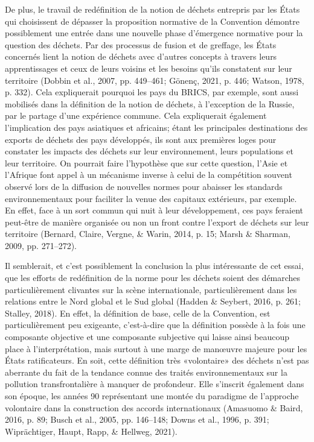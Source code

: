 \documentclass[12pt]{ulaval}
\begin{document}
De plus, le travail de redéfinition de la notion de déchets entrepris par les États qui choisissent de dépasser la proposition normative de la Convention démontre possiblement une entrée dans une nouvelle phase d'émergence normative pour la question des déchets. Par des processus de fusion et de greffage, les États concernés lient la notion de déchets avec d'autres concepts à travers leurs apprentissages et ceux de leurs voisins et les besoins qu'ils constatent sur leur territoire (Dobbin et al., 2007, pp. 449--461; Gönenç, 2021, p. 446; Watson, 1978, p. 332). Cela expliquerait pourquoi les pays du BRICS, par exemple, sont aussi mobilisés dans la définition de la notion de déchets, à l'exception de la Russie, par le partage d'une expérience commune. Cela expliquerait également l'implication des pays asiatiques et africains; étant les principales destinations des exports de déchets des pays développés, ils sont aux premières loges pour constater les impacts des déchets sur leur environnement, leurs populations et leur territoire. On pourrait faire l'hypothèse que sur cette question, l'Asie et l'Afrique font appel à un mécanisme inverse à celui de la compétition souvent observé lors de la diffusion de nouvelles normes pour abaisser les standards environnementaux pour faciliter la venue des capitaux extérieurs, par exemple. En effet, face à un sort commun qui nuit à leur développement, ces pays feraient peut-être de manière organisée ou non un front contre l'export de déchets sur leur territoire (Bernard, Claire, Vergne, \& Warin, 2014, p. 15; Marsh \& Sharman, 2009, pp. 271--272).

Il semblerait, et c'est possiblement la conclusion la plus intéressante de cet essai, que les efforts de redéfinition de la norme pour les déchets soient des démarches particulièrement clivantes sur la scène internationale, particulièrement dans les relations entre le Nord global et le Sud global (Hadden \& Seybert, 2016, p. 261; Stalley, 2018). En effet, la définition de base, celle de la Convention, est particulièrement peu exigeante, c'est-à-dire que la définition possède à la fois une composante objective et une composante subjective qui laisse ainsi beaucoup place à l'interprétation, mais surtout à une marge de manœuvre majeure pour les États ratificateurs. En soit, cette définition très «volontaire» des déchets n'est pas aberrante du fait de la tendance connue des traités environnementaux sur la pollution transfrontalière à manquer de profondeur. Elle s'inscrit également dans son époque, les années 90 représentant une montée du paradigme de l'approche volontaire dans la construction des accords internationaux (Amasuomo \& Baird, 2016, p. 89; Busch et al., 2005, pp. 146--148; Downs et al., 1996, p. 391; Wiprächtiger, Haupt, Rapp, \& Hellweg, 2021).
\end{document}
